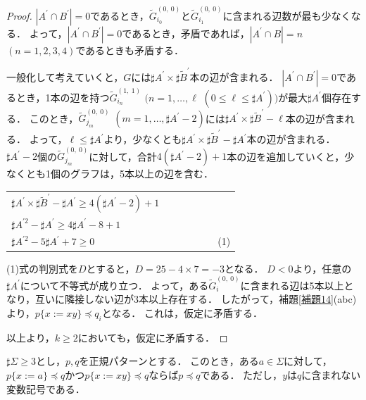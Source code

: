 \begin{proof}
$| A^{\prime} \cap B^{\prime} |=0$であるとき，$\tilde{G}^{(0,~0)}_{i_{0}}$と$\tilde{G}^{(0,~0)}_{i_{1}}$に含まれる辺数が最も少なくなる．
よって，$| A^{\prime} \cap B^{\prime} |=0$であるとき，矛盾であれば，$| A^{\prime} \cap B |=n$ $(n=1,2,3,4)$であるときも矛盾する．

一般化して考えていくと，$G$には$\sharp A^{\prime} \times \sharp\tilde{B}^{\prime}$本の辺が含まれる．
$| A^{\prime} \cap B^{\prime} |=0$であるとき，1本の辺を持つ$\tilde{G}^{(1,~1)}_{i_{n}}$ $(n=1,\ldots, \ell$ $(0 \le \ell \le \sharp A^{\prime}))$が最大$\sharp A^{\prime}$個存在する．
このとき，$\tilde{G}^{(0,~0)}_{j_{m}}$ $(m=1,\ldots, \sharp A^{\prime}-2)$には$\sharp A^{\prime} \times \sharp\tilde{B}^{\prime} - \ell$本の辺が含まれる．
よって，$\ell \le \sharp A^{\prime}$より，少なくとも$\sharp A^{\prime} \times \sharp\tilde{B}^{\prime} - \sharp A^{\prime}$本の辺が含まれる．
$\sharp A^{\prime}-2$個の$\tilde{G}^{(0,~0)}_{j_{m}}$に対して，合計$4(\sharp A^{\prime}-2) +1$本の辺を追加していくと，少なくとも1個のグラフは，5本以上の辺を含む．

\begin{center}
  \begin{tabular}{l}
  $\sharp A^{\prime} \times \sharp\tilde{B}^{\prime} -\sharp A^{\prime} \ge 4(\sharp A^{\prime}-2)+1$\\
  $\sharp A^{\prime 2}-\sharp A^{\prime} \ge 4\sharp A^{\prime}-8+1$\\
  $\sharp A^{\prime 2}-5\sharp A^{\prime}+7 \ge 0$~~~~~~~~~~~~~~~~~~~~~~~~~(1)
\end{tabular}
\end{center}


(1)式の判別式を$D$とすると，$D=25-4\times7=-3$となる．
$D<0$より，任意の$\sharp A^{\prime}$について不等式が成り立つ．
よって，ある$\tilde{G}^{(0,~0)}_{i}$に含まれる辺は5本以上となり，互いに隣接しない辺が3本以上存在する．
したがって，補題\ref{補題14}(abc)より，$p \{x:=xy \} \preceq q_{i}$となる．
これは，仮定に矛盾する．  

以上より，$k \ge 2$においても，仮定に矛盾する．
\end{proof}

\begin{lem}\label{補題15}
$\sharp \Sigma \ge 3$とし，$p,q$を正規パターンとする．
このとき，ある$a \in \Sigma$に対して，
$p \{ x := a \} \preceq q$かつ$p \{ x := xy \} \preceq q$ならば$p \preceq q$である．
ただし，$y$は$q$に含まれない変数記号である．
\end{lem}

%
